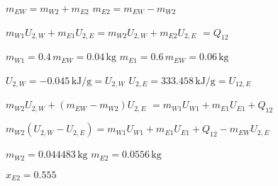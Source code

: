\( m_{EW} = m_{W2} + m_{E2} \)  
\( m_{E2} = m_{EW} - m_{W2} \)  

\( m_{W1} U_{2,W} + m_{E1} U_{2,E} = m_{W2} U_{2,W} + m_{E2} U_{2,E} \)  
\( = Q_{12} \)  

\( m_{W1} = 0.4 \, m_{EW} = 0.04 \, \text{kg} \)  
\( m_{E1} = 0.6 \, m_{EW} = 0.06 \, \text{kg} \)  

\( U_{2,W} = -0.045 \, \text{kJ/g} = U_{2,W} \)  
\( U_{2,E} = 333.458 \, \text{kJ/g} = U_{12,E} \)  

\( m_{W2} U_{2,W} + (m_{EW} - m_{W2}) U_{2,E} \)  
\( = m_{W1} U_{W1} + m_{E1} U_{E1} + Q_{12} \)  

\( m_{W2} (U_{2,W} - U_{2,E}) = m_{W1} U_{W1} + m_{E1} U_{E1} + Q_{12} - m_{EW} U_{2,E} \)  

\( m_{W2} = 0.044483 \, \text{kg} \)  
\( m_{E2} = 0.0556 \, \text{kg} \)  

\( x_{E2} = 0.555 \)